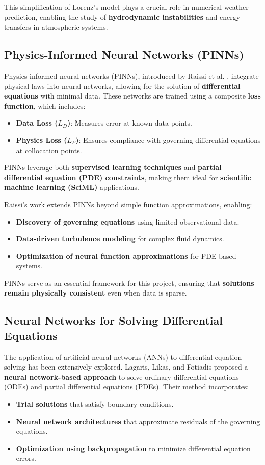 \documentclass{article}
\begin{document}
This simplification of Lorenz's model plays a crucial role in numerical weather prediction, enabling the study of \textbf{hydrodynamic instabilities} and energy transfers in atmospheric systems.

\subsection{Physics-Informed Neural Networks (PINNs)}
Physics-informed neural networks (PINNs), introduced by Raissi et al. \cite{raissi2019}, integrate physical laws into neural networks, allowing for the solution of \textbf{differential equations} with minimal data. These networks are trained using a composite \textbf{loss function}, which includes:
\begin{itemize}
    \item \textbf{Data Loss ($L_D$)}: Measures error at known data points.
    \item \textbf{Physics Loss ($L_F$)}: Ensures compliance with governing differential equations at collocation points.
\end{itemize}

PINNs leverage both \textbf{supervised learning techniques} and \textbf{partial differential equation (PDE) constraints}, making them ideal for \textbf{scientific machine learning (SciML)} applications.

Raissi's work extends PINNs beyond simple function approximations, enabling:
\begin{itemize}
    \item \textbf{Discovery of governing equations} using limited observational data.
    \item \textbf{Data-driven turbulence modeling} for complex fluid dynamics.
    \item \textbf{Optimization of neural function approximations} for PDE-based systems.
\end{itemize}

PINNs serve as an essential framework for this project, ensuring that \textbf{solutions remain physically consistent} even when data is sparse.

\subsection{Neural Networks for Solving Differential Equations}
The application of artificial neural networks (ANNs) to differential equation solving has been extensively explored. Lagaris, Likas, and Fotiadis \cite{lagaris1998} proposed a \textbf{neural network-based approach} to solve ordinary differential equations (ODEs) and partial differential equations (PDEs). Their method incorporates:
\begin{itemize}
    \item \textbf{Trial solutions} that satisfy boundary conditions.
    \item \textbf{Neural network architectures} that approximate residuals of the governing equations.
    \item \textbf{Optimization using backpropagation} to minimize differential equation errors.
\end{itemize}
\end{document}
